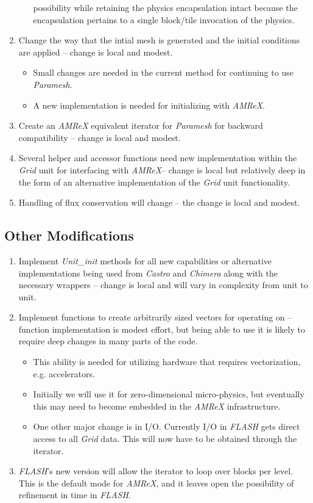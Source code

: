 \documentclass{article}
\newcommand{\flash}{{\it FLASH}\xspace}
\newcommand{\amrex}{{\it AMReX}\xspace}
\newcommand{\paramesh}{{\it Paramesh}\xspace}
\newcommand{\castro}{{\it Castro}\xspace}
\newcommand{\chimera}{{\it Chimera}\xspace}
\newcommand{\grid}{{\it Grid}\xspace}
\begin{document}
\begin{enumerate}
\begin{itemize}
possibility while retaining the physics encapsulation intact because
the encapsulation pertains to a single block/tile invocation of the physics.
\end{itemize}
\item Change the way that the intial mesh is generated and the initial
conditions are applied -- change is local and modest.
\begin{itemize}
\item Small changes are needed in the current method for continuing
to use \paramesh.
\item A new implementation is needed for initializing with \amrex.
\end{itemize}
\item Create an \amrex equivalent iterator for \paramesh for backward
compatibility -- change is local and modest.
\item Several helper and accessor functions need new implementation within the
\grid unit for interfacing with \amrex -- change is local but
relatively deep in the form of an alternative implementation of the
\grid unit functionality.
\item Handling of flux conservation will change -- the change is local
and modest.
\end{enumerate}

\subsection{Other Modifications}
\label{sec:other}
\begin{enumerate}
\item Implement {\it Unit\_init} methods for all new capabilities or
alternative implementations being used from \castro and \chimera along
with the necessary wrappers -- change is local and will vary in
complexity from unit to unit.
\item Implement functions to create arbitrarily sized vectors for
operating on -- function implementation is modest effort, but being
able to use it is likely to require deep changes in many parts of the
code.
\begin{itemize}
\item This ability is needed for utilizing hardware that requires
vectorization, e.g. accelerators.
\item Initially we will use it for zero-dimensional micro-physics, but
eventually this may need to become embedded in the \amrex
infrastructure.
\item One other major change is in I/O. Currently I/O in \flash gets
direct access to all \grid data. This will now have to be obtained
through the iterator.
\end{itemize}
\item \flash's new version will allow the iterator to loop over blocks
per level. This is the default mode for \amrex, and it leaves open the
possibility of refinement in time in \flash.
\end{enumerate}
\end{document}
